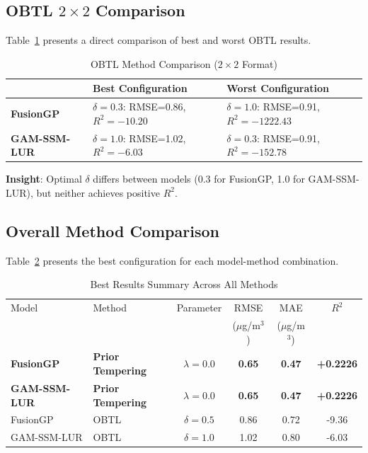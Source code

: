 \subsection{OBTL \(2 \times 2\) Comparison}
\label{subsec:obtl_2x2}

Table~\ref{tab:obtl_2x2} presents a direct comparison of best and worst OBTL results.

\begin{table}[htbp]
\centering
\caption{OBTL Method Comparison (\(2 \times 2\) Format)}
\label{tab:obtl_2x2}
\begin{tabular}{lll}
\toprule
 & \textbf{Best Configuration} & \textbf{Worst Configuration} \\
\midrule
\textbf{FusionGP} & \(\delta=0.3\): RMSE=0.86, \(R^2=-10.20\) & \(\delta=1.0\): RMSE=0.91, \(R^2=-1222.43\) \\
\textbf{GAM-SSM-LUR} & \(\delta=1.0\): RMSE=1.02, \(R^2=-6.03\) & \(\delta=0.3\): RMSE=0.91, \(R^2=-152.78\) \\
\bottomrule
\end{tabular}
\end{table}

\textbf{Insight}: Optimal \(\delta\) differs between models (0.3 for FusionGP, 1.0 for GAM-SSM-LUR), but neither achieves positive \(R^2\).

\subsection{Overall Method Comparison}
\label{sec:overall_comparison}

Table~\ref{tab:overall_best} presents the best configuration for each model-method combination.

\begin{table}[htbp]
\centering
\caption{Best Results Summary Across All Methods}
\label{tab:overall_best}
\begin{tabular}{llcccc}
\toprule
Model & Method & Parameter & RMSE & MAE & \(R^2\) \\
 &  &  & (\(\mu\)g/m\(^3\)) & (\(\mu\)g/m\(^3\)) &  \\
\midrule
\textbf{FusionGP} & \textbf{Prior Tempering} & \textbf{\(\lambda=0.0\)} & \textbf{0.65} & \textbf{0.47} & \textbf{+0.2226} \\
\textbf{GAM-SSM-LUR} & \textbf{Prior Tempering} & \textbf{\(\lambda=0.0\)} & \textbf{0.65} & \textbf{0.47} & \textbf{+0.2226} \\
FusionGP & OBTL & \(\delta=0.5\) & 0.86 & 0.72 & -9.36 \\
GAM-SSM-LUR & OBTL & \(\delta=1.0\) & 1.02 & 0.80 & -6.03 \\
\bottomrule
\end{tabular}
\end{table}

